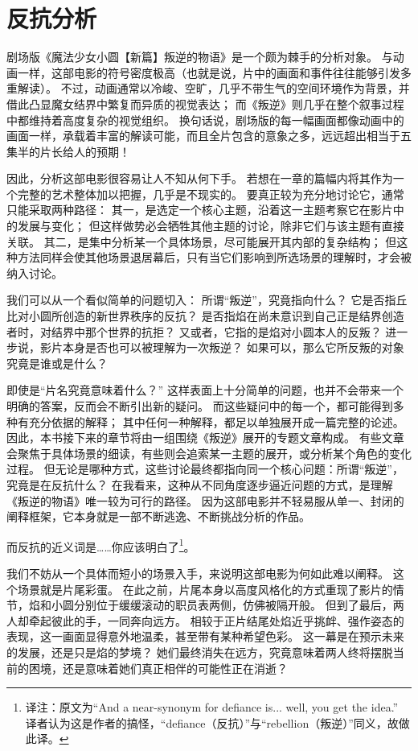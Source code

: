 \chapter{反抗分析}
剧场版《魔法少女小圆【新篇】叛逆的物语》是一个颇为棘手的分析对象。
与动画一样，这部电影的符号密度极高（也就是说，片中的画面和事件往往能够引发多重解读）。
不过，动画通常以冷峻、空旷，几乎不带生气的空间环境作为背景，并借此凸显魔女结界中繁复而异质的视觉表达；
而《叛逆》则几乎在整个叙事过程中都维持着高度复杂的视觉组织。
换句话说，剧场版的每一幅画面都像动画中的画面一样，承载着丰富的解读可能，而且全片包含的意象之多，远远超出相当于五集半的片长给人的预期！

因此，分析这部电影很容易让人不知从何下手。
若想在一章的篇幅内将其作为一个完整的艺术整体加以把握，几乎是不现实的。
要真正较为充分地讨论它，通常只能采取两种路径：
其一，是选定一个核心主题，沿着这一主题考察它在影片中的发展与变化；
但这样做势必会牺牲其他主题的讨论，除非它们与该主题有直接关联。
其二，是集中分析某一个具体场景，尽可能展开其内部的复杂结构；
但这种方法同样会使其他场景退居幕后，只有当它们影响到所选场景的理解时，才会被纳入讨论。

我们可以从一个看似简单的问题切入：
所谓“叛逆”，究竟指向什么？
它是否指丘比对小圆所创造的新世界秩序的反抗？
是否指焰在尚未意识到自己正是结界创造者时，对结界中那个世界的抗拒？
又或者，它指的是焰对小圆本人的反叛？
进一步说，影片本身是否也可以被理解为一次叛逆？
如果可以，那么它所反叛的对象究竟是谁或是什么？

即使是“片名究竟意味着什么？”
这样表面上十分简单的问题，也并不会带来一个明确的答案，反而会不断引出新的疑问。
而这些疑问中的每一个，都可能得到多种有充分依据的解释；
其中任何一种解释，都足以单独展开成一篇完整的论述。
因此，本书接下来的章节将由一组围绕《叛逆》展开的专题文章构成。
有些文章会聚焦于具体场景的细读，有些则会追索某一主题的展开，或分析某个角色的变化过程。
但无论是哪种方式，这些讨论最终都指向同一个核心问题：所谓“叛逆”，究竟是在反抗什么？
在我看来，这种从不同角度逐步逼近问题的方式，是理解《叛逆的物语》唯一较为可行的路径。
因为这部电影并不轻易服从单一、封闭的阐释框架，它本身就是一部不断逃逸、不断挑战分析的作品。

而反抗的近义词是……你应该明白了\footnote{%
    译注：原文为``And a near-synonym for defiance is... well, you get the idea.''
         译者认为这是作者的搞怪，``defiance（反抗）''与``rebellion（叛逆）''同义，故做此译。
}。

我们不妨从一个具体而短小的场景入手，来说明这部电影为何如此难以阐释。
这个场景就是片尾彩蛋。
在此之前，片尾本身以高度风格化的方式重现了影片的情节，焰和小圆分别位于缓缓滚动的职员表两侧，仿佛被隔开般。
但到了最后，两人却牵起彼此的手，一同奔向远方。
相较于正片结尾处焰近乎挑衅、强作姿态的表现，这一画面显得意外地温柔，甚至带有某种希望色彩。
这一幕是在预示未来的发展，还是只是焰的梦境？
她们最终消失在远方，究竟意味着两人终将摆脱当前的困境，还是意味着她们真正相伴的可能性正在消逝？

